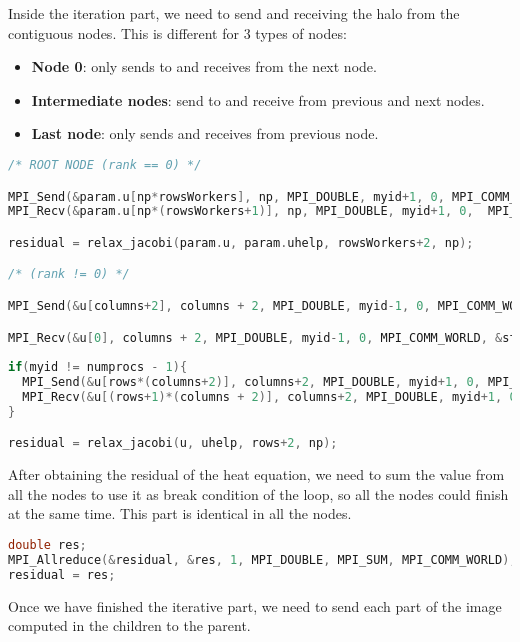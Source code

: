 \documentclass[a4paper, 10pt]{article}
\begin{document}
Inside the iteration part, we need to send and receiving the halo from the contiguous nodes. This is different for 3 types of nodes:

\begin{itemize}
  \item \textbf{Node 0}: only sends to and receives from the next node.
  \item \textbf{Intermediate nodes}: send to and receive from previous and next nodes.
  \item \textbf{Last node}: only sends and receives from previous node.
\end{itemize}

\begin{lstlisting}[language=c, caption={Communications between nodes inside the iterations}]
/* ROOT NODE (rank == 0) */

MPI_Send(&param.u[np*rowsWorkers], np, MPI_DOUBLE, myid+1, 0, MPI_COMM_WORLD);
MPI_Recv(&param.u[np*(rowsWorkers+1)], np, MPI_DOUBLE, myid+1, 0,  MPI_COMM_WORLD, &status);

residual = relax_jacobi(param.u, param.uhelp, rowsWorkers+2, np); 

/* (rank != 0) */

MPI_Send(&u[columns+2], columns + 2, MPI_DOUBLE, myid-1, 0, MPI_COMM_WORLD);

MPI_Recv(&u[0], columns + 2, MPI_DOUBLE, myid-1, 0, MPI_COMM_WORLD, &status);
                    
if(myid != numprocs - 1){
  MPI_Send(&u[rows*(columns+2)], columns+2, MPI_DOUBLE, myid+1, 0, MPI_COMM_WORLD);
  MPI_Recv(&u[(rows+1)*(columns + 2)], columns+2, MPI_DOUBLE, myid+1, 0, MPI_COMM_WORLD, &status);
}

residual = relax_jacobi(u, uhelp, rows+2, np);
\end{lstlisting}

After obtaining the residual of the heat equation, we need to sum the value from all the nodes to use it as break condition of the loop, so all the nodes could finish at the same time. This part is identical in all the nodes.

\begin{lstlisting}[language=c, caption={Allreduce for residual value}]
double res;
MPI_Allreduce(&residual, &res, 1, MPI_DOUBLE, MPI_SUM, MPI_COMM_WORLD);
residual = res;
\end{lstlisting}

Once we have finished the iterative part, we need to send each part of the image computed in the children to the parent.
\end{document}
